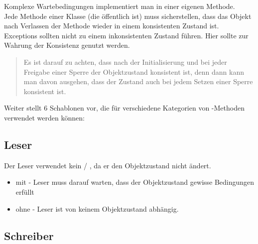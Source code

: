 \noindent
Komplexe Wartebedingungen implementiert man in einer eigenen Methode.\\

\noindent
Jede Methode einer Klasse (die öffentlich ist) muss sicherstellen, dass das Objekt nach Verlassen der Methode wieder in einem konsistenten Zustand ist.\\

\noindent
Exceptions sollten nicht zu einem inkonsistenten Zustand führen. Hier sollte  zur Wahrung der Konsistenz genutzt werden.

\blockquote[{\cite[142]{Oec22}}]{
Es ist darauf zu achten, dass nach der Initialisierung und bei jeder Freigabe einer Sperre der Objektzustand konsistent ist, denn dann kann man davon ausgehen, dass der Zustand auch bei jedem Setzen einer Sperre konsistent ist.
}

\noindent
Weiter stellt \cite[138 ff.]{Oec22} 6 Schablonen vor, die für verschiedene Kategorien von -Methoden verwendet werden können:


\subsection*{Leser}

Der Leser verwendet kein  / , da er den Objektzustand nicht ändert.

\begin{itemize}
    \item mit  - Leser muss darauf warten, dass der Objektzustand gewisse Bedingungen erfüllt
    \item ohne  - Leser ist von keinem Objektzustand abhängig.
\end{itemize}


\subsection*{Schreiber}

